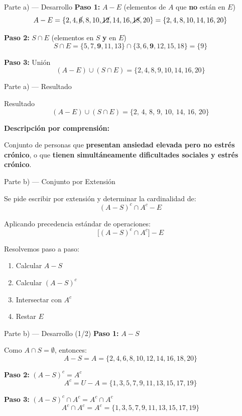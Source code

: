 \documentclass[11pt]{beamer}
\begin{document}
	\begin{frame}{Parte a) — Desarrollo}
		\textbf{Paso 1:} $A - E$ (elementos de $A$ que \textbf{no} están en $E$)
		\[
		A - E = \{2, 4, \cancel{6}, 8, 10, \cancel{12}, 14, 16, \cancel{18}, 20\} = \{2, 4, 8, 10, 14, 16, 20\}
		\]
		
		\medskip
		\textbf{Paso 2:} $S \cap E$ (elementos en $S$ \textbf{y} en $E$)
		\[
		S \cap E = \{5, 7, \mathbf{9}, 11, 13\} \cap \{3, 6, \mathbf{9}, 12, 15, 18\} = \{9\}
		\]
		
		\medskip
		\textbf{Paso 3:} Unión
		\[
		(A - E) \cup (S \cap E) = \{2, 4, 8, 9, 10, 14, 16, 20\}
		\]
	\end{frame}
	
	\begin{frame}{Parte a) — Resultado}
		\begin{exampleblock}{Resultado}
			\[
			(A - E) \cup (S \cap E) = \{2,\, 4,\, 8,\, 9,\, 10,\, 14,\, 16,\, 20\}
			\]
		\end{exampleblock}
		
		\bigskip
		\textbf{Descripción por comprensión:}
		
		\medskip
		Conjunto de personas que \textbf{presentan ansiedad elevada pero no estrés crónico},
		o que \textbf{tienen simultáneamente dificultades sociales y estrés crónico}.
	\end{frame}
	
	\begin{frame}{Parte b) — Conjunto por Extensión}
		\begin{block}{Se pide escribir por extensión y determinar la cardinalidad de:}
			\[
			(A - S)^c \cap A^c - E
			\]
		\end{block}
		
		\bigskip
		Aplicando precedencia estándar de operaciones:
		\[
		\bigl[(A - S)^c \cap A^c\bigr] - E
		\]
		
		\medskip
		Resolvemos paso a paso:
		\begin{enumerate}
			\item Calcular $A - S$
			\item Calcular $(A-S)^c$
			\item Intersectar con $A^c$
			\item Restar $E$
		\end{enumerate}
	\end{frame}
	
	\begin{frame}{Parte b) — Desarrollo (1/2)}
		\textbf{Paso 1:} $A - S$
		
		Como $A \cap S = \emptyset$, entonces:
		\[
		A - S = A = \{2, 4, 6, 8, 10, 12, 14, 16, 18, 20\}
		\]
		
		\medskip
		\textbf{Paso 2:} $(A - S)^c = A^c$
		\[
		A^c = U - A = \{1, 3, 5, 7, 9, 11, 13, 15, 17, 19\}
		\]
		
		\medskip
		\textbf{Paso 3:} $(A-S)^c \cap A^c = A^c \cap A^c$
		\[
		A^c \cap A^c = A^c = \{1, 3, 5, 7, 9, 11, 13, 15, 17, 19\}
		\]
	\end{frame}
	
\end{document}
